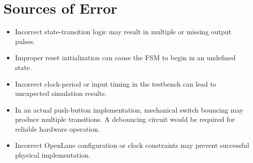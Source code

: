 \documentclass[12pt,a4paper]{report}
\begin{document}
\section{Sources of Error}

\begin{itemize}
    \item Incorrect state-transition logic may result in multiple or missing output pulses.
    
    \item Improper reset initialization can cause the FSM to begin in an undefined state.
    
    \item Incorrect clock-period or input timing in the testbench can lead to unexpected simulation results.
    
    \item In an actual push-button implementation, mechanical switch bouncing may produce multiple transitions. A debouncing circuit would be required for reliable hardware operation.
    
    \item Incorrect OpenLane configuration or clock constraints may prevent successful physical implementation.
\end{itemize}
\end{document}
